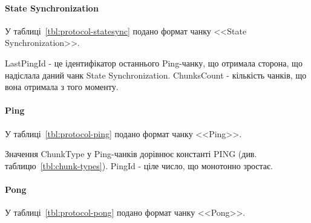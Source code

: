\paragraph{State Synchronization}

У таблиці~\ref{tbl:protocol-statesync} подано формат чанку <<State Synchronization>>.

\begin{table}[htbp]
\end{table}

LastPingId - це ідентифікатор останнього Ping-чанку, що отримала сторона, що
надіслала даний чанк State Synchronization. ChunksCount - кількість чанків,
що вона отримала з того моменту.

\paragraph{Ping}

У таблиці~\ref{tbl:protocol-ping} подано формат чанку <<Ping>>.

\begin{table}[htbp]
\end{table}

Значення ChunkType у Ping-чанків дорівнює константі PING (див.
таблицю~\ref{tbl:chunk-types}). PingId - ціле число, що монотонно зростає.

\paragraph{Pong}

У таблиці~\ref{tbl:protocol-pong} подано формат чанку <<Pong>>.

